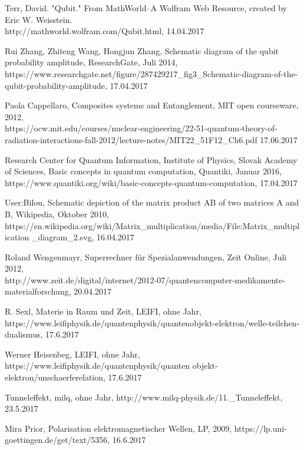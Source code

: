 \documentclass[12pt]{report}
\begin{document}
\begin{thebibliography}{9}
Terr, David. "Qubit." From MathWorld--A Wolfram Web Resource, created by Eric W. Weisstein. \\http://mathworld.wolfram.com/Qubit.html, 14.04.2017

Rui Zhang, Zhiteng Wang, Hongjun Zhang, Schematic diagram of the qubit probability amplitude, ResearchGate, Juli 2014,
\\https://www.researchgate.net/figure/287429217\_fig3\_Schematic-diagram-of-the-qubit-probability-amplitude, 17.04.2017

Paola Cappellaro, Composites systems and Entanglement, MIT open courseware, 2012,
\\https://ocw.mit.edu/courses/nuclear-engineering/22-51-quantum-theory-of-radiation-interactions-fall-2012/lecture-notes/MIT22\_51F12\_Ch6.pdf 17.06.2017

Research Center for Quantum Information, Institute of Physics, Slovak Academy of Sciences, Basic concepts in quantum computation, Quantiki, Januar 2016,
\\https://www.quantiki.org/wiki/basic-concepts-quantum-computation, 17.04.2017

User:Bilou, Schematic depiction of the matrix product AB of two matrices A and B, Wikipedia, Oktober 2010,
\\https://en.wikipedia.org/wiki/Matrix\_multiplication/media/File:Matrix\_multiplication \_diagram\_2.svg, 16.04.2017

Roland Wengenmayr, Superrechner für Spezialanwendungen, Zeit Online, Juli 2012,
\\http://www.zeit.de/digital/internet/2012-07/quantencomputer-medikamente-materialforschung, 20.04.2017


R. Sexl, Materie in Raum und Zeit, LEIFI,  ohne Jahr, https://www.leifiphysik.de/quantenphysik/quantenobjekt-elektron/welle-teilchen-dualismus, 17.6.2017

Werner Heisenbeg, LEIFI, ohne Jahr, https://www.leifiphysik.de/quantenphysik/quanten objekt-elektron/unschaerferelation, 17.6.2017

Tunneleffekt, milq, ohne Jahr, http://www.milq-physik.de/11.\_Tunneleffekt, 23.5.2017

Mira Prior, Polarisation elektromagnetischer Wellen, LP, 2009, https://lp.uni-goettingen.de/get/text/5356, 16.6.2017


\end{thebibliography}
\end{document}
